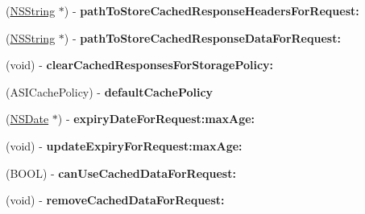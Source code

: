 \begin{DoxyCompactItemize}
\item 
\hypertarget{protocol_a_s_i_cache_delegate-p_ab9a190279d92a9fc5d7efeff1efad0ad}{
(\hyperlink{class_n_s_string}{\-N\-S\-String} $\ast$) -\/ {\bfseries path\-To\-Store\-Cached\-Response\-Headers\-For\-Request\-:}}
\label{protocol_a_s_i_cache_delegate-p_ab9a190279d92a9fc5d7efeff1efad0ad}

\item 
\hypertarget{protocol_a_s_i_cache_delegate-p_ab7f2a212c2d6391b1d9fb7a8da9f2c39}{
(\hyperlink{class_n_s_string}{\-N\-S\-String} $\ast$) -\/ {\bfseries path\-To\-Store\-Cached\-Response\-Data\-For\-Request\-:}}
\label{protocol_a_s_i_cache_delegate-p_ab7f2a212c2d6391b1d9fb7a8da9f2c39}

\item 
\hypertarget{protocol_a_s_i_cache_delegate-p_abb2c511be4be2274bd3e812ea978e2a6}{
(void) -\/ {\bfseries clear\-Cached\-Responses\-For\-Storage\-Policy\-:}}
\label{protocol_a_s_i_cache_delegate-p_abb2c511be4be2274bd3e812ea978e2a6}

\item 
\hypertarget{protocol_a_s_i_cache_delegate-p_a1207aea079945294e7bb48c621d82a67}{
(\-A\-S\-I\-Cache\-Policy) -\/ {\bfseries default\-Cache\-Policy}}
\label{protocol_a_s_i_cache_delegate-p_a1207aea079945294e7bb48c621d82a67}

\item 
\hypertarget{protocol_a_s_i_cache_delegate-p_a36d0b83c9017dba94a93acc3cae9aa65}{
(\hyperlink{class_n_s_date}{\-N\-S\-Date} $\ast$) -\/ {\bfseries expiry\-Date\-For\-Request\-:max\-Age\-:}}
\label{protocol_a_s_i_cache_delegate-p_a36d0b83c9017dba94a93acc3cae9aa65}

\item 
\hypertarget{protocol_a_s_i_cache_delegate-p_ad793f424847f6f7a2c5154fb8cec1bb6}{
(void) -\/ {\bfseries update\-Expiry\-For\-Request\-:max\-Age\-:}}
\label{protocol_a_s_i_cache_delegate-p_ad793f424847f6f7a2c5154fb8cec1bb6}

\item 
\hypertarget{protocol_a_s_i_cache_delegate-p_a7cf0deb09983a6b552fd7a2130529c95}{
(\-B\-O\-O\-L) -\/ {\bfseries can\-Use\-Cached\-Data\-For\-Request\-:}}
\label{protocol_a_s_i_cache_delegate-p_a7cf0deb09983a6b552fd7a2130529c95}

\item 
\hypertarget{protocol_a_s_i_cache_delegate-p_a2e34141ed1db825ca2d1c292b068193e}{
(void) -\/ {\bfseries remove\-Cached\-Data\-For\-Request\-:}}
\label{protocol_a_s_i_cache_delegate-p_a2e34141ed1db825ca2d1c292b068193e}


\end{DoxyCompactItemize}
